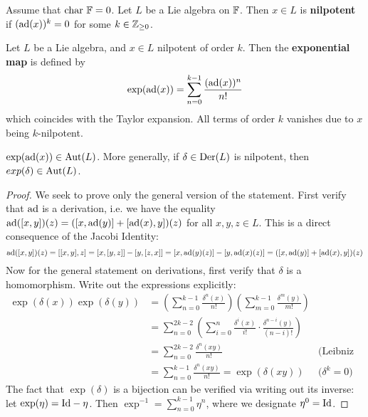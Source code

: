 \documentclass{article}
\begin{document}
\begin{definition}
    Assume that $\mathrm{char}\ {\mathbb{F}} = 0$. Let $L$ be a Lie algebra on $\mathbb{F}$. Then $x \in L$ is \textbf{nilpotent} if $(\operatorname{ad}(x))^k = 0$ for some $k \in \mathbb{Z}_{\geq 0}$.
\end{definition}

\begin{definition}
    Let $L$ be a Lie algebra, and $x \in L$ nilpotent of order $k$. Then the \textbf{exponential map} is defined by
    \[
        \exp(\operatorname{ad}(x)) = \sum_{n = 0}^{k-1} \frac{(\operatorname{ad}(x))^n}{n!}
    \] 
    which coincides with the Taylor expansion. All terms of order $k$ vanishes due to $x$ being $k$-nilpotent.
\end{definition}

\begin{lemma}
    $\exp(\operatorname{ad}(x)) \in \mathrm{Aut}(L)$. More generally, if $\delta \in \operatorname{Der}(L)$ is nilpotent, then $exp(\delta) \in \mathrm{Aut}(L)$.
\end{lemma}

\begin{proof}
    We seek to prove only the general version of the statement. First verify that $\operatorname{ad}$ is a derivation, i.e. we have the equality $\operatorname{ad}([x, y])(z) = ([x, \operatorname{ad}(y)] + [\operatorname{ad}(x), y])(z)$ for all $x, y, z \in L$. This is a direct consequence of the Jacobi Identity:
    \[
        \operatorname{ad}([x, y])(z) = [[x, y], z] = [x, [y, z]] - [y, [z, x]] = [x, \operatorname{ad}(y)(z)] - [y, \operatorname{ad}(x)(z)] = ([x, \operatorname{ad}(y)] + [\operatorname{ad}(x), y])(z)
    \]
    Now for the general statement on derivations, first verify that $\delta$ is a homomorphism. Write out the expressions explicitly:
    \begin{align*}
        \exp(\delta(x)) \exp(\delta(y))
        & = \left( \sum_{n = 0}^{k-1} \frac{\delta^n(x)}{n!} \right) \left( \sum_{m = 0}^{k-1} \frac{\delta^m(y)}{m!} \right) \\
        & = \sum_{n = 0}^{2k-2} \left( \sum_{i = 0}^n \frac{\delta^i(x)}{i!} \cdot \frac{\delta^{n-i}(y)}{(n-i)!} \right) \\
        & = \sum_{n = 0}^{2k-2} \frac{\delta^n(xy)}{n!} & \text{(Leibniz Rule)} \\
        & = \sum_{n = 0}^{k-1} \frac{\delta^n(xy)}{n!} = \exp(\delta(xy)) & \text{($\delta^k = 0$)}
    \end{align*}
    The fact that $\exp(\delta)$ is a bijection can be verified via writing out its inverse: let $\exp(\eta) = \mathrm{Id} - \eta$. Then $\exp^{-1} = \sum_{n=0}^{k-1} \eta^n$, where we designate $\eta^0 = \mathrm{Id}$. 
\end{proof}
\end{document}
